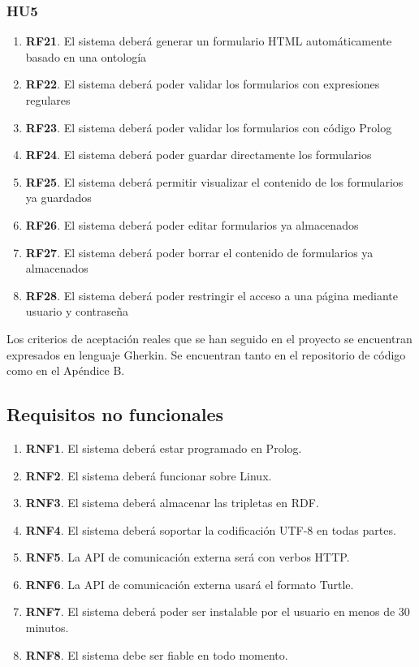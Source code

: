 \documentclass[openright,twoside,12pt]{book}
\begin{document}
\subsubsection{HU5}
\begin{enumerate}
    \item\textbf{RF21}. El sistema deberá generar un formulario HTML automáticamente basado en una ontología
    \item\textbf{RF22}. El sistema deberá poder validar los formularios con expresiones regulares
    \item\textbf{RF23}. El sistema deberá poder validar los formularios con código Prolog
    \item\textbf{RF24}. El sistema deberá poder guardar directamente los formularios
    \item\textbf{RF25}. El sistema deberá permitir visualizar el contenido de los formularios ya guardados
    \item\textbf{RF26}. El sistema deberá poder editar formularios ya almacenados
    \item\textbf{RF27}. El sistema deberá poder borrar el contenido de formularios ya almacenados
    \item\textbf{RF28}. El sistema deberá poder restringir el acceso a una página mediante usuario y contraseña
\end{enumerate}

Los criterios de aceptación reales que se han seguido en el proyecto se encuentran expresados en lenguaje Gherkin. Se encuentran tanto en el repositorio de código como en el Apéndice B.

\subsection{Requisitos no funcionales}
\begin{enumerate}
    \item\textbf{RNF1}. El sistema deberá estar programado en Prolog.
    \item\textbf{RNF2}. El sistema deberá funcionar sobre Linux.
    \item\textbf{RNF3}. El sistema deberá almacenar las tripletas en RDF.
    \item\textbf{RNF4}. El sistema deberá soportar la codificación UTF-8 en todas partes.
    \item\textbf{RNF5}. La API de comunicación externa será con verbos HTTP.
    \item\textbf{RNF6}. La API de comunicación externa usará el formato Turtle.
    \item\textbf{RNF7}. El sistema deberá poder ser instalable por el usuario en menos de 30 minutos.
    \item\textbf{RNF8}. El sistema debe ser fiable en todo momento.
\end{enumerate}
\end{document}
